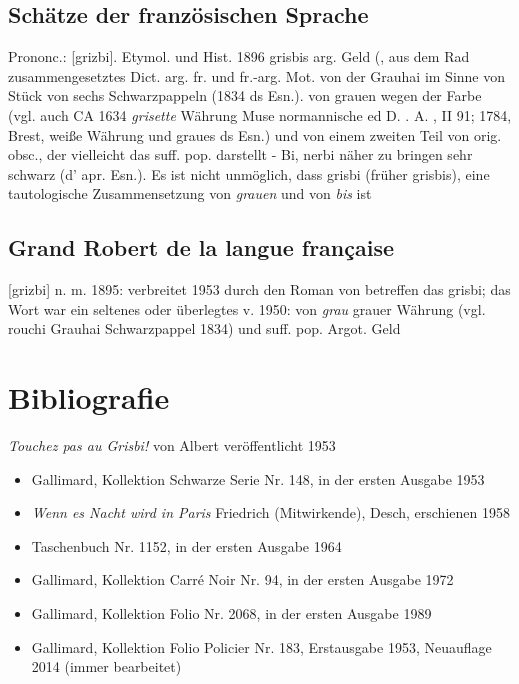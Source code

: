 \subsection*{Schätze der französischen Sprache}
Prononc.: [grizbi]. Etymol. und Hist. 1896 grisbis arg. \glqq{}Geld\grqq{} (, aus dem Rad zusammengesetztes Dict. arg. fr. und fr.-arg. Mot. von der Grauhai im Sinne von \glqq{}Stück von sechs Schwarzpappeln\grqq{} (1834 ds Esn.). von grauen wegen der Farbe (vgl. auch CA 1634 \emph{grisette} \glqq{}Währung\grqq{} Muse normannische ed D. . A. , II 91; 1784, Brest, weiße Währung und graues ds Esn.) und von einem zweiten Teil von orig. obsc., der vielleicht das suff. pop. darstellt - Bi, nerbi näher zu bringen \glqq{}sehr schwarz\grqq{} (d' apr. Esn.). Es ist nicht unmöglich, dass grisbi (früher grisbis), eine tautologische Zusammensetzung von \emph{grauen} und von \emph{bis} ist

\subsection*{Grand Robert de la langue française}
[grizbi] n. m. 1895: verbreitet 1953 durch den Roman von  betreffen das grisbi; das Wort war ein seltenes oder überlegtes v. 1950: von \emph{grau} \glqq{}grauer Währung\grqq{} (vgl. rouchi Grauhai \glqq{}Schwarzpappel\grqq{} 1834) und suff. pop. Argot. Geld


\section{Bibliografie\label{preamble-biblio}}

\emph{Touchez pas au Grisbi!} von Albert  veröffentlicht 1953

\begin{itemize}\itemsep=-3pt
	\item Gallimard, Kollektion Schwarze Serie Nr. 148, in der ersten Ausgabe 1953
	\item \emph{Wenn es Nacht wird in Paris} Friedrich  (Mitwirkende), Desch, erschienen 1958
	\item Taschenbuch Nr. 1152, in der ersten Ausgabe 1964
	\item Gallimard, Kollektion Carré Noir Nr. 94, in der ersten Ausgabe 1972
	\item Gallimard, Kollektion Folio Nr. 2068, in der ersten Ausgabe 1989
	\item Gallimard, Kollektion Folio Policier Nr. 183, Erstausgabe 1953, Neuauflage 2014 (immer bearbeitet)
\end{itemize}

